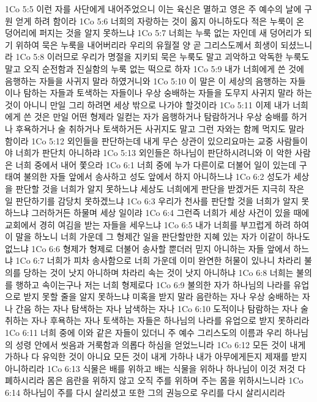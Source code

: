 1Co 5:5  이런 자를 사단에게 내어주었으니 이는 육신은 멸하고 영은 주 예수의 날에 구원 얻게 하려 함이라
1Co 5:6  너희의 자랑하는 것이 옳지 아니하도다 적은 누룩이 온 덩어리에 퍼지는 것을 알지 못하느냐
1Co 5:7  너희는 누룩 없는 자인데 새 덩어리가 되기 위하여 묵은 누룩을 내어버리라 우리의 유월절 양 곧 그리스도께서 희생이 되셨느니라
1Co 5:8  이러므로 우리가 명절을 지키되 묵은 누룩도 말고 괴악하고 악독한 누룩도 말고 오직 순전함과 진실함의 누룩 없는 떡으로 하자
1Co 5:9  내가 너희에게 쓴 것에 음행하는 자들을 사귀지 말라 하였거니와
1Co 5:10  이 말은 이 세상의 음행하는 자들이나 탐하는 자들과 토색하는 자들이나 우상 숭배하는 자들을 도무지 사귀지 말라 하는 것이 아니니 만일 그리 하려면 세상 밖으로 나가야 할것이라
1Co 5:11  이제 내가 너희에게 쓴 것은 만일 어떤 형제라 일컫는 자가 음행하거나 탐람하거나 우상 숭배를 하거나 후욕하거나 술 취하거나 토색하거든 사귀지도 말고 그런 자와는 함께 먹지도 말라 함이라
1Co 5:12  외인들을 판단하는데 내게 무슨 상관이 있으리요마는 교중 사람들이야 너희가 판단치 아니하랴
1Co 5:13  외인들은 하나님이 판단하시려니와 이 악한 사람은 너희 중에서 내어 쫓으라
1Co 6:1  너희 중에 누가 다른이로 더불어 일이 있는데 구태여 불의한 자들 앞에서 송사하고 성도 앞에서 하지 아니하느냐
1Co 6:2  성도가 세상을 판단할 것을 너희가 알지 못하느냐 세상도 너희에게 판단을 받겠거든 지극히 작은 일 판단하기를 감당치 못하겠느냐
1Co 6:3  우리가 천사를 판단할 것을 너희가 알지 못하느냐 그러하거든 하물며 세상 일이랴
1Co 6:4  그런즉 너희가 세상 사건이 있을 때에 교회에서 경히 여김을 받는 자들을 세우느냐
1Co 6:5  내가 너희를 부끄럽게 하려 하여 이 말을 하노니 너희 가운데 그 형제간 일을 판단할만한 지혜 있는 자가 이같이 하나도 없느냐
1Co 6:6  형제가 형제로 더불어 송사할 뿐더러 믿지 아니하는 자들 앞에서 하느냐
1Co 6:7  너희가 피차 송사함으로 너희 가운데 이미 완연한 허물이 있나니 차라리 불의를 당하는 것이 낫지 아니하며 차라리 속는 것이 낫지 아니하냐
1Co 6:8  너희는 불의를 행하고 속이는구나 저는 너희 형제로다
1Co 6:9  불의한 자가 하나님의 나라를 유업으로 받지 못할 줄을 알지 못하느냐 미혹을 받지 말라 음란하는 자나 우상 숭배하는 자나 간음 하는 자나 탐색하는 자나 남색하는 자나
1Co 6:10  도적이나 탐람하는 자나 술 취하는 자나 후욕하는 자나 토색하는 자들은 하나님의 나라를 유업으로 받지 못하리라
1Co 6:11  너희 중에 이와 같은 자들이 있더니 주 예수 그리스도의 이름과 우리 하나님의 성령 안에서 씻음과 거룩함과 의롭다 하심을 얻었느니라
1Co 6:12  모든 것이 내게 가하나 다 유익한 것이 아니요 모든 것이 내게 가하나 내가 아무에게든지 제재를 받지 아니하리라
1Co 6:13  식물은 배를 위하고 배는 식물을 위하나 하나님이 이것 저것 다 폐하시리라 몸은 음란을 위하지 않고 오직 주를 위하며 주는 몸을 위하시느니라
1Co 6:14  하나님이 주를 다시 살리셨고 또한 그의 권능으로 우리를 다시 살리시리라

